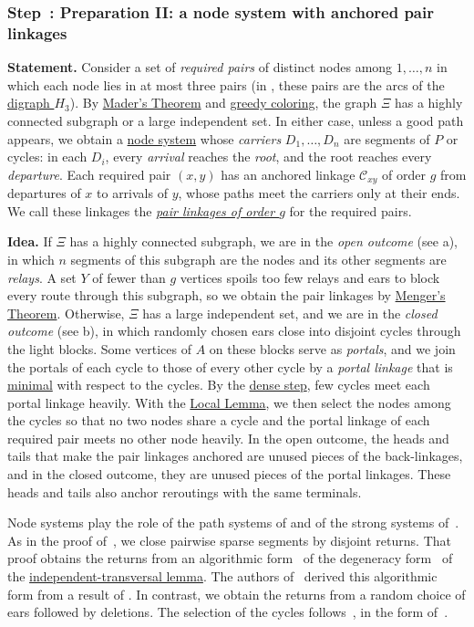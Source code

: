 \documentclass[fontsize=12pt,leading=14pt]{fullpaper}
\newcommand{\Ccal}{\mathcal{C}}
\newcounter{step}
\renewcommand{\thestep}{\arabic{step}}
\newcommand{\step}[2]{%
\subsubsection*{\refstepcounter{step}\label{step:#1}Step~\thestep: #2}}
\newcommand{\stmt}[1]{\par\noindent\textbf{Statement.} #1\par\smallskip}
\newcommand{\idea}[1]{\noindent\textbf{Idea.} #1\par}
\begin{document}
\step{prep-nodes}{Preparation II: a node system with anchored pair linkages}
\stmt{Consider a set of \emph{required pairs} of distinct nodes among $1,\dots,n$ in which each node lies in at most three pairs (in \zcref{step:sparse}, these pairs are the arcs of the \hyperref[lem:subcubic]{digraph $H_3$}).
  By \hyperref[prop:mader]{Mader's Theorem} and \hyperref[obs:greedy]{greedy coloring}, the graph $\Xi$ has a highly connected subgraph or a large independent set.
  In either case, unless a good path appears, we obtain a \hyperref[def:node-system]{node system} whose \emph{carriers} $D_1,\dots,D_n$ are segments of $P$ or cycles: in each $D_i$, every \emph{arrival} reaches the \emph{root}, and the root reaches every \emph{departure}.
  Each required pair $(x,y)$ has an anchored linkage $\Ccal_{xy}$ of order $g$ from departures of $x$ to arrivals of $y$, whose paths meet the carriers only at their ends.
We call these linkages the \hyperref[def:node-system]{\emph{pair linkages of order $g$}} for the required pairs.}
\idea{If $\Xi$ has a highly connected subgraph, we are in the \emph{open outcome} (see \zcref{fig:ov-prep-outcomes}a), in which $n$ segments of this subgraph are the nodes and its other segments are \emph{relays}.
  A set $Y$ of fewer than $g$ vertices spoils too few relays and ears to block every route through this subgraph, so we obtain the pair linkages by \hyperref[prop:menger]{Menger's Theorem}.
  Otherwise, $\Xi$ has a large independent set, and we are in the \emph{closed outcome} (see \zcref{fig:ov-prep-outcomes}b), in which randomly chosen ears close into disjoint cycles through the light blocks.
  Some vertices of $A$ on these blocks serve as \emph{portals}, and we join the portals of each cycle to those of every other cycle by a \emph{portal linkage} that is \hyperref[def:minimal]{minimal} with respect to the cycles.
  By the \hyperref[lem:dense-anchored]{dense step}, few cycles meet each portal linkage heavily.
  With the \hyperref[prop:lll]{Local Lemma}, we then select the nodes among the cycles so that no two nodes share a cycle and the portal linkage of each required pair meets no other node heavily.
  In the open outcome, the heads and tails that make the pair linkages anchored are unused pieces of the back-linkages, and in the closed outcome, they are unused pieces of the portal linkages.
  These heads and tails also anchor reroutings with the same terminals.

  Node systems play the role of the path systems of \textcite[Definition~4.5]{KawarabayashiK15} and of the strong systems of~\cite[Definition~5.1]{CLNS26}.
  As in the proof of~\cite[Lemma~4.13]{CLNS26}, we close pairwise sparse segments by disjoint returns.
  That proof obtains the returns from an algorithmic form~\cite[Proposition~3.9]{CLNS26} of the degeneracy form~\cite[Lemma~4.3]{RW12} of the \hyperref[prop:indep-transversal]{independent-transversal lemma}.
  The authors of~\cite{CLNS26} derived this algorithmic form from a result of \textcite[Theorem~1.5]{Harris22}.
  In contrast, we obtain the returns from a random choice of ears followed by deletions.
The selection of the cycles follows~\cite[Lemma~4.7]{KawarabayashiK15}, in the form of~\cite[Lemma~5.11]{HKMM26a}.}
\end{document}
